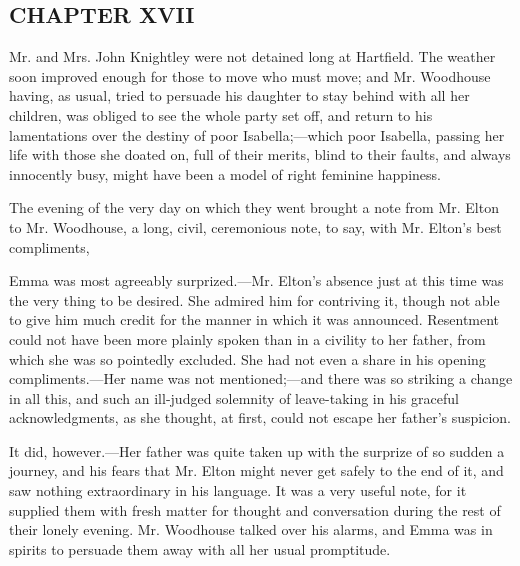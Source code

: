 \subsection[chapter-xvii]{\useURL[url17][][][]\from[url17]CHAPTER XVII}

Mr. and Mrs. John Knightley were not detained long at Hartfield. The weather soon improved enough for those to move who must move; and Mr. Woodhouse having, as usual, tried to persuade his daughter to stay behind with all her children, was obliged to see the whole party set off, and return to his lamentations over the destiny of poor Isabella;---which poor Isabella, passing her life with those she doated on, full of their merits, blind to their faults, and always innocently busy, might have been a model of right feminine happiness.

The evening of the very day on which they went brought a note from Mr. Elton to Mr. Woodhouse, a long, civil, ceremonious note, to say, with Mr. Elton's best compliments, 

Emma was most agreeably surprized.---Mr. Elton's absence just at this time was the very thing to be desired. She admired him for contriving it, though not able to give him much credit for the manner in which it was announced. Resentment could not have been more plainly spoken than in a civility to her father, from which she was so pointedly excluded. She had not even a share in his opening compliments.---Her name was not mentioned;---and there was so striking a change in all this, and such an ill-judged solemnity of leave-taking in his graceful acknowledgments, as she thought, at first, could not escape her father's suspicion.

It did, however.---Her father was quite taken up with the surprize of so sudden a journey, and his fears that Mr. Elton might never get safely to the end of it, and saw nothing extraordinary in his language. It was a very useful note, for it supplied them with fresh matter for thought and conversation during the rest of their lonely evening. Mr. Woodhouse talked over his alarms, and Emma was in spirits to persuade them away with all her usual promptitude.

